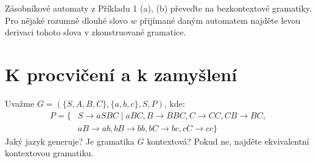 \documentclass[a4paper,12pt]{amsart}
\begin{document}
\begin{problem}

    Zásobníkové automaty z Příkladu 1 (a), (b) převeďte na bezkontextové gramatiky. Pro nějaké rozumně dlouhé slovo $w$ přijímané daným automatem najděte levou derivaci tohoto slova v zkonstruované gramatice.

\end{problem}


\section*{K procvičení a k zamyšlení}


\medskip\begin{problem}
    
    Uvažme $G=(\{S,A,B,C\},\{a,b,c\},S,P)$, kde:
    \begin{align*}
        P=\{&S\rightarrow aSBC\mid aBC, B\rightarrow BBC,  C\rightarrow CC, CB\rightarrow BC,\\ 
        &aB\rightarrow ab, bB\rightarrow bb, bC\rightarrow bc, cC\rightarrow cc\}
    \end{align*}
    Jaký jazyk generuje? Je gramatika $G$ kontextová? Pokud ne, najděte ekvivalentní kontextovou gramatiku.
    
\end{problem}
\end{document}
